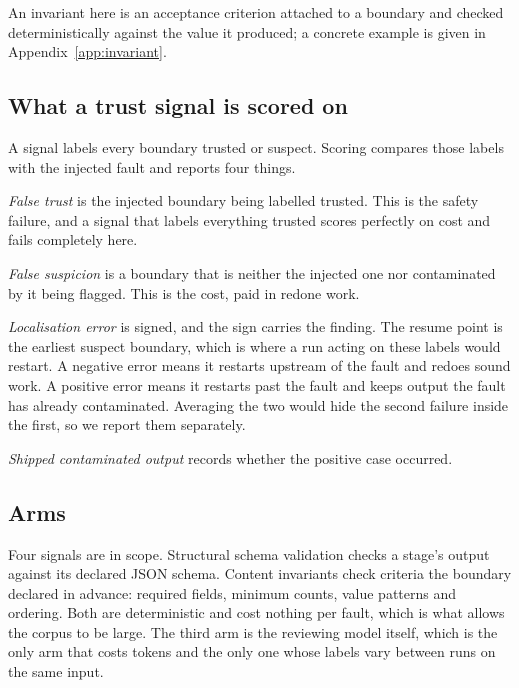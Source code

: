An invariant here is an acceptance criterion attached to a boundary and checked
deterministically against the value it produced; a concrete example is given in
Appendix~\ref{app:invariant}.

\subsection{What a trust signal is scored on}

A signal labels every boundary trusted or suspect. Scoring compares those labels
with the injected fault and reports four things.

\emph{False trust} is the injected boundary being labelled trusted. This is the
safety failure, and a signal that labels everything trusted scores perfectly on cost
and fails completely here.

\emph{False suspicion} is a boundary that is neither the injected one nor
contaminated by it being flagged. This is the cost, paid in redone work.

\emph{Localisation error} is signed, and the sign carries the finding. The resume
point is the earliest suspect boundary, which is where a run acting on these labels
would restart. A negative error means it restarts upstream of the fault and redoes
sound work. A positive error means it restarts past the fault and keeps output the
fault has already contaminated. Averaging the two would hide the second failure
inside the first, so we report them separately.

\emph{Shipped contaminated output} records whether the positive case occurred.

\subsection{Arms}

Four signals are in scope. Structural schema validation checks a stage's output
against its declared JSON schema. Content invariants check criteria the boundary
declared in advance: required fields, minimum counts, value patterns and ordering.
Both are deterministic and cost nothing per fault, which is what allows the corpus to
be large. The third arm is the reviewing model itself, which is the only arm that
costs tokens and the only one whose labels vary between runs on the same input.
